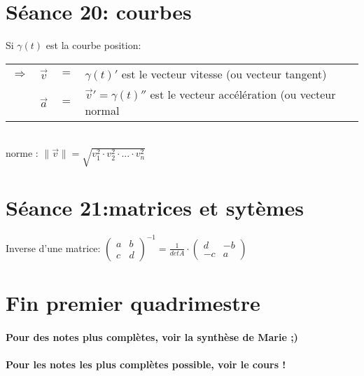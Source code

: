 \documentclass[12pt]{article}
\begin{document}
\section*{S\'eance 20: courbes}

Si $\gamma(t)$ est la courbe position: \\
\begin{tabular}{r c c l }
	\(\Rightarrow\) & \(\vec{v}\) & \( = \) & \(\gamma(t)'\) est le vecteur vitesse (ou vecteur tangent)\\
	& \(\vec{a}\) & \( = \) & \(\vec{v}' = \gamma(t)''\) est le vecteur acc\'el\'eration (ou vecteur normal
\end{tabular} \\ \newline
norme : \(\|\vec{v}\| = \sqrt{v_{1}^{2} \cdot v_{2}^{2} \cdot ... \cdot v_{n}^{2} }\)

\section*{ S\'eance 21:matrices et syt\`emes}

 Inverse d'une matrice: $\begin{pmatrix}
a & b \\
c & d
\end{pmatrix}^{-1} = \frac{1}{det A} \cdot \begin{pmatrix} d & -b \\ -c & a \end{pmatrix}$

\section*{Fin premier quadrimestre}
\paragraph{Pour des notes plus compl\`etes, voir la synth\`ese de Marie ;)}
\paragraph{Pour les notes les plus compl\`etes possible, voir le cours !}
\end{document}

